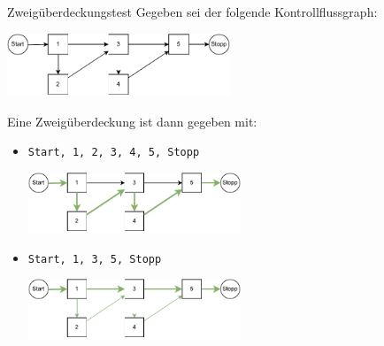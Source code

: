 \begin{example}{Zweigüberdeckungstest}
    Gegeben sei der folgende Kontrollflussgraph:
    \begin{center}
        \includegraphics[width=0.5\textwidth]{includes/figures/example_kontrollfluss_base.pdf}
    \end{center}

    Eine Zweigüberdeckung ist dann gegeben mit:
    \begin{itemize}
        \item \texttt{Start, 1, 2, 3, 4, 5, Stopp}

              \vspace{1em}
              \begin{center}
                  \includegraphics[width=0.5\textwidth]{includes/figures/example_kontrollfluss_zweig_1.pdf}
              \end{center}
        \item \texttt{Start, 1, 3, 5, Stopp}

              \vspace{1em}
              \begin{center}
                  \includegraphics[width=0.5\textwidth]{includes/figures/example_kontrollfluss_zweig_2.pdf}
              \end{center}
    \end{itemize}
\end{example}


